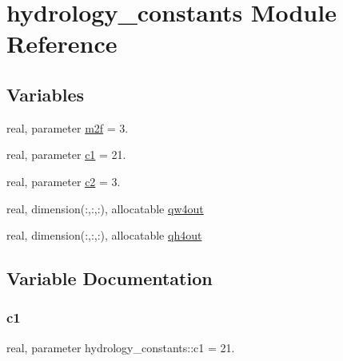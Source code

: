 \hypertarget{namespacehydrology__constants}{}\section{hydrology\+\_\+constants Module Reference}
\label{namespacehydrology__constants}
\subsection*{Variables}
\begin{DoxyCompactItemize}
\item 
real, parameter \hyperlink{namespacehydrology__constants_ab490db8c3db1149de2c3a999ca405462}{m2f} = 3.
\item 
real, parameter \hyperlink{namespacehydrology__constants_aab37efe722e2cb3021d692662a4f71be}{c1} = 21.
\item 
real, parameter \hyperlink{namespacehydrology__constants_af41d19dbcc0f506fe98fcd9d081ee8d9}{c2} = 3.
\item 
real, dimension(\+:,\+:,\+:), allocatable \hyperlink{namespacehydrology__constants_a4a968142e8621f39c2e739983340bb25}{qw4out}
\item 
real, dimension(\+:,\+:,\+:), allocatable \hyperlink{namespacehydrology__constants_aab3e1ed337a2f4bb8ac1ae647b9ebd65}{qh4out}
\end{DoxyCompactItemize}


\subsection{Variable Documentation}
\mbox{\label{namespacehydrology__constants_aab37efe722e2cb3021d692662a4f71be}} 
\subsubsection{\texorpdfstring{c1}{c1}}
{\footnotesize\ttfamily real, parameter hydrology\+\_\+constants\+::c1 = 21.}

\mbox{\label{namespacehydrology__constants_af41d19dbcc0f506fe98fcd9d081ee8d9}} 
